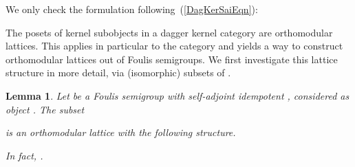 \documentclass{article}
\newtheorem{lemma}[theorem]{Lemma}
\newenvironment{proof}[1][Proof]{ \begin{trivlist}\item[\hskip \labelsep {\bfseries #1}]}{ \end{trivlist}}
\begin{document}
\begin{proof}
We only check the formulation following~(\ref{DagKerSaiEqn}):

\end{proof}


The posets of kernel subobjects in a dagger kernel category are
orthomodular lattices. This applies in particular to the category
 and yields a way to construct orthomodular lattices
out of Foulis semigroups. We first investigate this lattice structure
in more detail, via (isomorphic) subsets of .


\begin{lemma}
\label{FoulisOMKerLem}
Let  be a Foulis semigroup with self-adjoint idempotent ,
considered as object . The subset


\noindent is an orthomodular lattice with the following structure.


\noindent In fact, .
\end{lemma}
\end{document}
